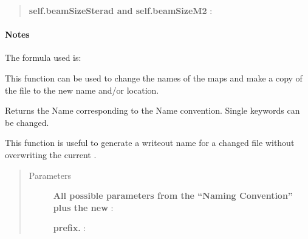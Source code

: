 \documentclass[a4paper,10pt,english]{sphinxmanual}
\begin{document}
\begin{fulllineitems}
\begin{fulllineitems}
\begin{quote}
\begin{description}
\textbf{self.beamSizeSterad and self.beamSizeM2} :

\end{description}\end{quote}
\paragraph{Notes}

The formula used is:

\end{fulllineitems}


\begin{fulllineitems}
\label{maps:astrolyze.maps.main.Map.change_map_name}
This function can be used to change the names of the maps and make a
copy of the file to the new name and/or location.

\end{fulllineitems}


\begin{fulllineitems}
\label{maps:astrolyze.maps.main.Map.returnName}
Returns the Name corresponding to the Name convention. Single keywords
can be changed.

This function is useful to generate a writeout name for a changed file
without overwriting the current .
\begin{quote}\begin{description}
\item[{Parameters }] \leavevmode
\textbf{All possible parameters from the ``Naming Convention'' plus the new} :

\textbf{prefix.} :

\end{description}\end{quote}

\end{fulllineitems}


\end{fulllineitems}
\end{document}
